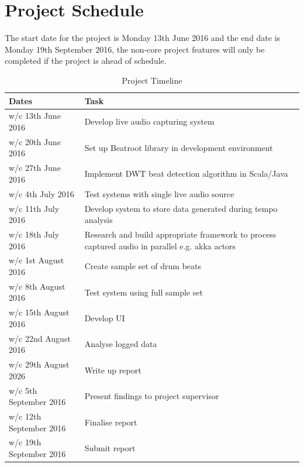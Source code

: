 \documentclass[a4paper, 11pt]{article}
\begin{document}
\clearpage
\maketitle{} 
\section {Project Schedule}
The start date for the project is Monday 13th June 2016 and the end date is Monday 19th September 2016, the non-core project features will only be completed if the project is ahead of schedule.
\begin{table}[h]
\caption{Project Timeline} 
\centering
\begin{tabular}{|p{4cm}|p{8cm}|}
 \hline
\textbf{Dates} & \textbf{Task}\\ [0.5ex]
\hline 
w/c 13th June 2016 & Develop live audio capturing system\\
\hline 
w/c 20th June 2016 & Set up Beatroot library in development environment\\
\hline 
w/c 27th June 2016 & Implement DWT beat detection algorithm in Scala/Java\\
\hline 
w/c 4th July 2016 & Test systems with single live audio source\\
\hline 
w/c 11th July 2016 & Develop system to store data generated during tempo analysis\\
\hline 
w/c 18th July 2016 & Research and build appropriate framework to process captured audio in parallel e.g. akka actors\\
\hline 
w/c 1st August 2016 & Create sample set of drum beats\\
\hline 
w/c 8th August 2016 & Test system using full sample set\\
\hline 
w/c 15th August 2016 & Develop UI\\
\hline 
w/c 22nd August 2016 & Analyse logged data\\
\hline 
w/c 29th August 2026 & Write up report\\
\hline 
w/c 5th September 2016 & Present findings to project supervisor\\
\hline 
w/c 12th September 2016 & Finalise report\\
\hline 
w/c 19th September 2016 & Submit report\\
\hline
\end{tabular}
\end{table}
\clearpage
\maketitle{} 
\end{document}
